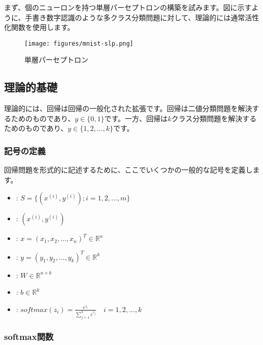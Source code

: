 \begin{content}

まず、個のニューロンを持つ単層パーセプトロンの構築を試みます。図に示すように、手書き数字認識のような多クラス分類問題に対して、理論的には通常活性化関数を使用します。

\begin{figure}[H]
\centering
\texttt{[image: figures/mnist-slp.png]}
\caption{単層パーセプトロン}
 \label{fig:mnist-slp}
\end{figure}

\subsection{理論的基礎}

理論的には、回帰は回帰の一般化された拡張です。回帰は二値分類問題を解決するためのものであり、$y \in \{ 0,1\}$です。一方、回帰は$ k $クラス分類問題を解決するためのものであり、$y \in \{ 1,2,...,k\}$です。

\subsubsection{記号の定義}

回帰問題を形式的に記述するために、ここでいくつかの一般的な記号を定義します。

 \begin{itemize}
   \item {}: $ S = \{ ({x^{(i)}},{y^{(i)}});i = 1,2,...,m\} $
   \item {}: $ ({x^{(i)}},{y^{(i)}}) $
   \item {}: $ x = ({x_1},{x_2},...,{x_n})^{T}  \in {\mathbb{R}^n} $
   \item {}: $ y = ({y_1},{y_2},...,{y_k})^{T} \in {\mathbb{R}^k} $
   \item {}: $ W \in {\mathbb{R}^{n \times k}} $   
   \item {}: $ b \in {\mathbb{R}^k} $   
   \item {}: $ 
softmax {(z_i)} = \tfrac{{{e^{{z_i}}}}}{{\sum\limits_{j = 1}^k {{e^{{z_j}}}} }}  \quad i = 1,2,...,k
$
 \end{itemize}

\subsubsection{softmax関数}


\end{content}
